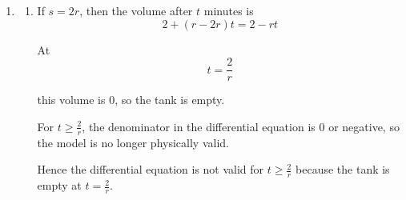 \documentclass[leqno]{article}
\begin{document}
\begin{enumerate}[
  label=\textbf{\arabic*.},
  leftmargin=*,
  topsep=0pt,
  partopsep=0pt,
  parsep=0pt
]
\begin{djsSolution}
\begin{enumerate}[label=\textbf{(\alph*)}]
\begin{enumerate}[label=(\roman*)]
    Integrating:
    \begin{align*}
    me^{rt/2} &= \int 10r e^{rt/2}\,\mathrm{d}t \\
    &= 10r\times\frac{2}{r} e^{rt/2}+c \\
    &= 20e^{rt/2}+c
    \end{align*}

    Therefore
    \[
    m=20+ce^{-rt/2}
    \]

    Using $m(0)=4$:
    \begin{align*}
    4 &= 20 + c e^{0} \\
    4 &= 20 + c \\
    c &= -16
    \end{align*}

    Hence
    \[
    m=20-16e^{-rt/2}
    \]

    \item When $s=r$, the volume is constant and equal to
    \[
    2+(r-r)t=2
    \]

    So the concentration is
    \[
    \frac{m}{2}=\frac{20-16e^{-rt/2}}{2}=10-8e^{-rt/2}
    \]

    After $2$ minutes, the concentration is $8$ grams per litre, so
    \[
    8=10-8e^{-r}
    \]

    Solving:
    \begin{align*}
    8e^{-r} &= 2 \\
    e^{-r} &= \frac14 \\
    -r &= \ln\left(\frac14\right) \\
    r &= \ln 4
    \end{align*}

    Therefore
    \[
    r=\ln 4 \approx 1.39
    \]

    So the required inflow rate is $r=\ln 4$ litres per minute.
  \end{enumerate}

  \item
  \begin{enumerate}[label=(\roman*)]
    \item If $s=2r$, then the volume after $t$ minutes is
    \[
    2+(r-2r)t=2-rt
    \]

    At
    \[
    t=\frac{2}{r}
    \]

    this volume is $0$, so the tank is empty.

    For $t\geq \frac{2}{r}$, the denominator in the differential equation is $0$ or negative, so the model is no longer physically valid.

    Hence the differential equation is not valid for $t\geq \frac{2}{r}$ because the tank is empty at $t=\frac{2}{r}$.


\end{enumerate}
\end{enumerate}
\end{djsSolution}
\end{enumerate}
\end{document}
